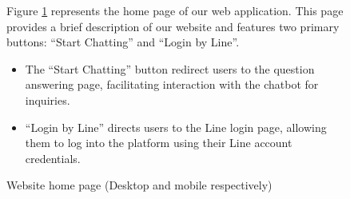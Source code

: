 \documentclass[12pt,oneside,openright,a4paper]{cpe-english-project}
\begin{document}
\begin{figure}[H]
\begin{minipage}{.3\textwidth}
      \end{minipage}
      \caption{Website home page (Desktop and mobile respectively)}\label{fig:HomePage}
      \begin{justify}
        \qquad Figure \ref{fig:HomePage} represents the home page of our web application. This page provides a brief description of our website and features two primary buttons: “Start Chatting” and “Login by Line”.
        \begin{itemize}
          \item The “Start Chatting” button redirect users to the question answering page, facilitating interaction with the chatbot for inquiries.
          \item “Login by Line” directs users to the Line login page, allowing them to log into the platform using their Line account credentials.
        \end{itemize}
      \end{justify}
    \end{figure}
    \newpage
\end{document}
